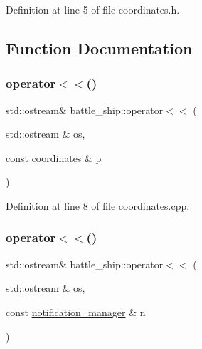 Definition at line 5 of file coordinates.\+h.



\subsection{Function Documentation}
\mbox{\label{namespacebattle__ship_ac73c2d37116f5d6ed25e71eef5c37dc8}} 
\subsubsection{\texorpdfstring{operator$<$$<$()}{operator<<()}\hspace{0.1cm}{\footnotesize\ttfamily [1/3]}}
{\footnotesize\ttfamily std\+::ostream\& battle\+\_\+ship\+::operator$<$$<$ (\begin{DoxyParamCaption}\item[{std\+::ostream \&}]{os,  }\item[{const \hyperlink{structbattle__ship_1_1coordinates}{coordinates} \&}]{p }\end{DoxyParamCaption})}



Definition at line 8 of file coordinates.\+cpp.

\mbox{\label{namespacebattle__ship_a1a93528abeff933fb4839aa528313c51}} 
\subsubsection{\texorpdfstring{operator$<$$<$()}{operator<<()}\hspace{0.1cm}{\footnotesize\ttfamily [2/3]}}
{\footnotesize\ttfamily std\+::ostream\& battle\+\_\+ship\+::operator$<$$<$ (\begin{DoxyParamCaption}\item[{std\+::ostream \&}]{os,  }\item[{const \hyperlink{classbattle__ship_1_1notification__manager}{notification\+\_\+manager} \&}]{n }\end{DoxyParamCaption})}



